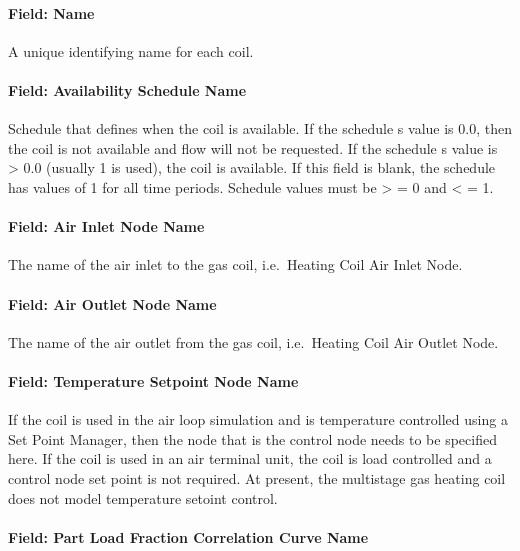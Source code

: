 \paragraph{Field: Name}\label{field-name-10-005}

A unique identifying name for each coil.

\paragraph{Field: Availability Schedule Name}\label{field-availability-schedule-name-5-001}

Schedule that defines when the coil is available. If the schedule s value is 0.0, then the coil is not available and flow will not be requested. If the schedule s value is \textgreater{} 0.0 (usually 1 is used), the coil is available. If this field is blank, the schedule has values of 1 for all time periods. Schedule values must be \textgreater{} = 0 and \textless{} = 1.

\paragraph{Field: Air Inlet Node Name}\label{field-air-inlet-node-name-7}

The name of the air inlet to the gas coil, i.e.~Heating Coil Air Inlet Node.

\paragraph{Field: Air Outlet Node Name}\label{field-air-outlet-node-name-7-000}

The name of the air outlet from the gas coil, i.e.~Heating Coil Air Outlet Node.

\paragraph{Field: Temperature Setpoint Node Name}\label{field-temperature-setpoint-node-name-5}

If the coil is used in the air loop simulation and is temperature controlled using a Set Point Manager, then the node that is the control node needs to be specified here. If the coil is used in an air terminal unit, the coil is load controlled and a control node set point is not required. At present, the multistage gas heating coil does not model temperature setoint control.

\paragraph{Field: Part Load Fraction Correlation Curve Name}\label{field-part-load-fraction-correlation-curve-name-1}

